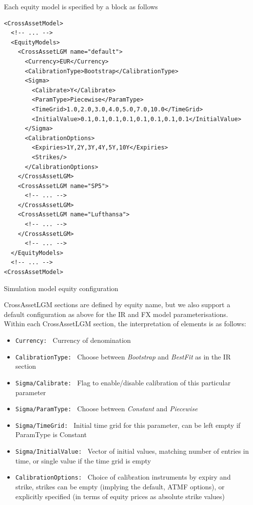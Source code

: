 \documentclass[12pt, a4paper]{article}
\begin{document}
\medskip

Each equity model is specified by a block as follows

\begin{listing}[H]
\begin{verbatim}
<CrossAssetModel>	
  <!-- ... -->
  <EquityModels>
    <CrossAssetLGM name="default">
      <Currency>EUR</Currency>
      <CalibrationType>Bootstrap</CalibrationType>
      <Sigma>
        <Calibrate>Y</Calibrate>
        <ParamType>Piecewise</ParamType>
        <TimeGrid>1.0,2.0,3.0,4.0,5.0,7.0,10.0</TimeGrid>
        <InitialValue>0.1,0.1,0.1,0.1,0.1,0.1,0.1,0.1</InitialValue>
      </Sigma>
      <CalibrationOptions>
        <Expiries>1Y,2Y,3Y,4Y,5Y,10Y</Expiries>
        <Strikes/>
      </CalibrationOptions>
    </CrossAssetLGM>
    <CrossAssetLGM name="SP5">
      <!-- ... -->
    </CrossAssetLGM>
    <CrossAssetLGM name="Lufthansa">
      <!-- ... -->
    </CrossAssetLGM>
      <!-- ... -->
  </EquityModels>
  <!-- ... -->
<CrossAssetModel>	
\end{verbatim}
\caption{Simulation model equity configuration}
\label{lst:simulation_model_eq_configuration}
\end{listing}

CrossAssetLGM sections are defined by equity name, but we also support a default configuration as above for the IR and 
FX model parameterisations.  Within each CrossAssetLGM section, the interpretation of elements is as follows:

\begin{itemize}
	\item {\tt Currency: } Currency of denomination
	\item {\tt CalibrationType: } Choose between {\em Bootstrap} and {\em BestFit} as in the IR section
	\item {\tt Sigma/Calibrate: } Flag to enable/disable calibration of this particular parameter
	\item {\tt Sigma/ParamType: } Choose between {\em Constant} and {\em Piecewise}
	\item {\tt Sigma/TimeGrid: } Initial time grid for this parameter, can be left empty if ParamType is Constant
	\item {\tt Sigma/InitialValue: } Vector of initial values, matching number of entries in time, or single value if 
	the time grid is empty
	\item {\tt CalibrationOptions: } Choice of calibration instruments by expiry and strike, strikes can be empty 
	(implying the default, ATMF options), or explicitly specified (in terms of equity prices as absolute strike values)
\end{itemize}
\end{document}
